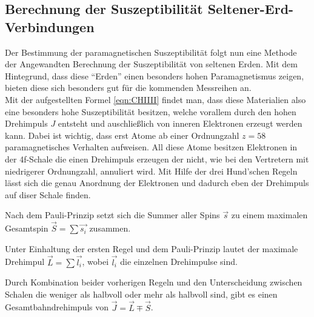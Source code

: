 \subsection{Berechnung der Suszeptibilität Seltener-Erd-Verbindungen}
\label{sadge2}
Der Bestimmung der paramagnetischen Suszeptibilität folgt nun eine Methode der Angewandten Berechnung der Suszeptibilität von 
seltenen Erden. Mit dem Hintegrund, dass diese \enquote{Erden} einen besonders hohen Paramagnetismus zeigen, bieten diese sich besonders
gut für die kommenden Messreihen an. 
\\
\newline
Mit der aufgestellten Formel \eqref{eqn:CHIIII} findet man, dass diese Materialien also eine besonders hohe Suszeptibilität besitzen, welche 
vorallem durch den hohen Drehimpuls $J$ entsteht und auschließlich von inneren Elektronen erzeugt werden kann.
Dabei ist wichtig, dass erst Atome ab einer Ordnungzahl $z=58$ paramagnetisches Verhalten aufweisen. 
All diese Atome besitzen Elektronen in der 4f-Schale die einen Drehimpuls erzeugen der nicht, wie bei den Vertretern mit niedrigerer
Ordnungzahl, annuliert wird. Mit Hilfe der drei Hund'schen Regeln lässt sich die genau Anordnung der Elektronen und dadurch eben der Drehimpuls
auf diser Schale finden.
\begin{description}
    \item Nach dem Pauli-Prinzip setzt sich die Summer aller Spins $\vec{s}$ zu einem maximalen Gesamtspin $\vec{S}=\sum \vec{s_i}$ zusammen. \\
    \item Unter Einhaltung der ersten Regel und dem Pauli-Prinzip lautet der maximale Drehimpul $\vec{L}= \sum \vec{l_i}$, wobei $\vec{l_i}$ die einzelnen Drehimpulse sind.  \\
    \item Durch Kombination beider vorherigen Regeln und den Unterscheidung zwischen Schalen die weniger als halbvoll oder mehr als halbvoll sind,
    gibt es einen Gesamtbahndrehimpuls von $\vec{J} =\vec{L} \mp \vec{S}$.
\end{description}



